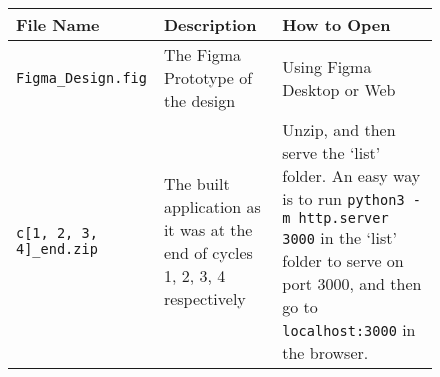 
\begin{figure}[h]
    \centering
    \begin{tabular}{|m{4cm}|p{5cm}|>{\raggedright\arraybackslash}p{5.5cm}|}
        \hline \textbf{File Name} & \textbf{Description} & \textbf{How to Open} \\ \hline
        \verb|Figma_Design.fig| & The Figma Prototype of the design & Using Figma Desktop or Web\\ \hline
        \verb|c[1, 2, 3, 4]_end.zip| & The built application as it was at the end of cycles 1, 2, 3, 4 respectively & Unzip, and then serve the `list' folder. \newline An easy way is to run \verb|python3 -m http.server 3000| in the `list' folder to serve on port 3000, and then go to \verb|localhost:3000| in the browser. \\ \hline
    \end{tabular}
\end{figure}
